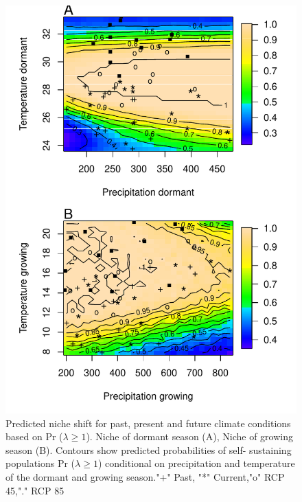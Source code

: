 \documentclass[12pt]{article}
\begin{document}
\begin{figure}%
  \begin{center}
    \includegraphics[width=0.78\linewidth]{Figures/niche_female_dominant.pdf}
  \caption{Predicted niche shift for past, present and future climate conditions based on Pr ($\lambda \geq 1$). Niche of dormant season (A), Niche of growing season (B). Contours show predicted probabilities of self- sustaining populations Pr ($\lambda \geq 1$) conditional on precipitation and temperature of the dormant and growing season."+" Past, "*" Current,"o" RCP 45,"." RCP 85}
  \label{fig:geoprojfd}
  \end{center}
\end{figure}
\end{document}
